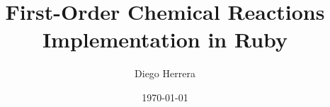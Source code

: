 %
\author[D. Herrera]{Diego Herrera}
\title[Chem. Reactions]{First-Order Chemical Reactions Implementation in Ruby}
\date{\today}
%
%
\makeatletter
{}
\makeatother
%
\renewcommand{\PrelimWords}
    {Chem. Reactions -- D. Herrera -- Version 1.0.0}
%
